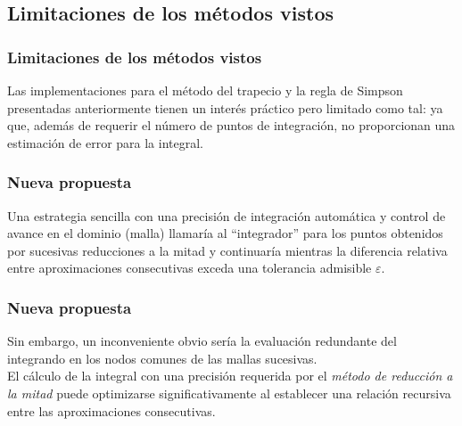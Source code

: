 \subsection*{Limitaciones de los métodos vistos}
\begin{frame}
\frametitle{Limitaciones de los métodos vistos}
Las implementaciones para el método del trapecio y la regla de Simpson presentadas anteriormente tienen un interés práctico pero limitado como tal: ya que, además de requerir el número de puntos de integración, no proporcionan una estimación de error para la integral.
\end{frame}
\begin{frame}
\frametitle{Nueva propuesta}
Una estrategia sencilla con una precisión de integración automática y control de avance en el dominio (malla) llamaría al \enquote{integrador} para los puntos obtenidos por sucesivas reducciones a la mitad y continuaría mientras la diferencia relativa entre aproximaciones consecutivas exceda una tolerancia admisible $\varepsilon$.
\end{frame}
\begin{frame}
\frametitle{Nueva propuesta}
Sin embargo, un inconveniente obvio sería la evaluación redundante del integrando en los nodos comunes de las mallas sucesivas.
\\
\bigskip
El cálculo de la integral con una precisión requerida por el \emph{método de reducción a la mitad} puede optimizarse significativamente al establecer una relación recursiva entre las aproximaciones consecutivas.
\end{frame}
